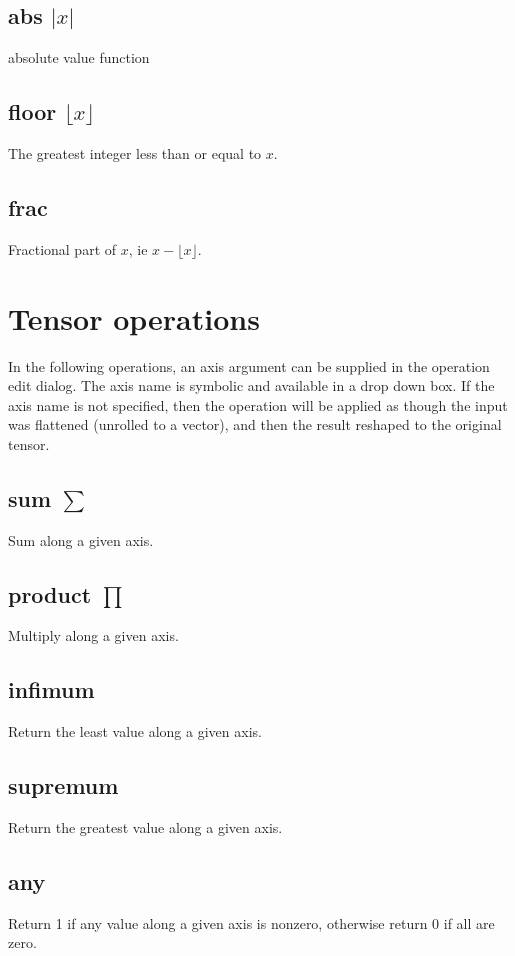 \subsection{abs $|x|$}\label{Operation:abs} absolute value function
\subsection{floor $\lfloor x\rfloor$}\label{Operation:floor} The greatest integer
  less than or equal to $x$.
\subsection{frac}\label{Operation:frac} Fractional part of $x$, ie $x-\lfloor x\rfloor$. 

\section{Tensor operations}\label{tensor operations}

In the following operations, an axis argument can be supplied in the
operation edit dialog. The axis name is symbolic and available in a
drop down box. If the axis name is not specified, then the operation
will be applied as though the input was flattened (unrolled to a
vector), and then the result reshaped to the original tensor.

\subsection{sum $\sum$}\label{Operation:sum} Sum along a given
axis. 

\subsection{product $\prod$}\label{Operation:product} Multiply along a given axis. 

\subsection{infimum}\label{Operation:infimum} Return the least value
along a given axis. 

\subsection{supremum}\label{Operation:supremum} Return the greatest value
along a given axis. 

\subsection{any}\label{Operation:any} Return 1 if any value
along a given axis is nonzero, otherwise return 0 if all are zero. 

